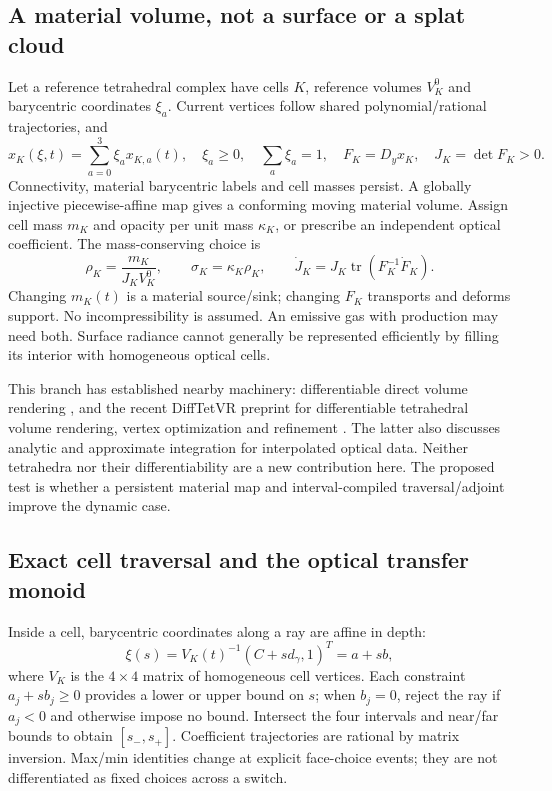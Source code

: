 \documentclass[10pt,letterpaper]{article}
\theoremstyle{remark}\newtheorem{counterexample}[proposition]{Counterexample}
\newcommand{\tr}{\operatorname{tr}}
\begin{document}
\subsection{A material volume, not a surface or a splat cloud}
Let a reference tetrahedral complex have cells $K$, reference volumes $V_K^0$ and barycentric coordinates $\xi_a$. Current vertices follow shared polynomial/rational trajectories, and
\begin{equation}
 x_K(\xi,t)=\sum_{a=0}^3\xi_ax_{K,a}(t),\quad
 \xi_a\geq0,\quad\sum_a\xi_a=1,\quad
 F_K=D_yx_K,\quad J_K=\det F_K>0. \label{eq:tet}
\end{equation}
Connectivity, material barycentric labels and cell masses persist. A globally injective piecewise-affine map gives a conforming moving material volume. Assign cell mass $m_K$ and opacity per unit mass $\kappa_K$, or prescribe an independent optical coefficient. The mass-conserving choice is
\begin{equation}
 \rho_K=\frac{m_K}{J_KV_K^0},\qquad \sigma_K=\kappa_K\rho_K,\qquad
 \dot J_K=J_K\tr(F_K^{-1}\dot F_K). \label{eq:tetdensity}
\end{equation}
Changing $m_K(t)$ is a material source/sink; changing $F_K$ transports and deforms support. No incompressibility is assumed. An emissive gas with production may need both. Surface radiance cannot generally be represented efficiently by filling its interior with homogeneous optical cells.

This branch has established nearby machinery: differentiable direct volume rendering \cite{diffdvr}, and the recent DiffTetVR preprint for differentiable tetrahedral volume rendering, vertex optimization and refinement \cite{difftet}. The latter also discusses analytic and approximate integration for interpolated optical data. Neither tetrahedra nor their differentiability are a new contribution here. The proposed test is whether a persistent material map and interval-compiled traversal/adjoint improve the dynamic case.

\subsection{Exact cell traversal and the optical transfer monoid}
Inside a cell, barycentric coordinates along a ray are affine in depth:
\begin{equation}
 \xi(s)=V_K(t)^{-1}(C+sd_\gamma,1)^T=a+sb,
\end{equation}
where $V_K$ is the $4\times4$ matrix of homogeneous cell vertices. Each constraint $a_j+sb_j\geq0$ provides a lower or upper bound on $s$; when $b_j=0$, reject the ray if $a_j<0$ and otherwise impose no bound. Intersect the four intervals and near/far bounds to obtain $[s_-,s_+]$. Coefficient trajectories are rational by matrix inversion. Max/min identities change at explicit face-choice events; they are not differentiated as fixed choices across a switch.
\end{document}

